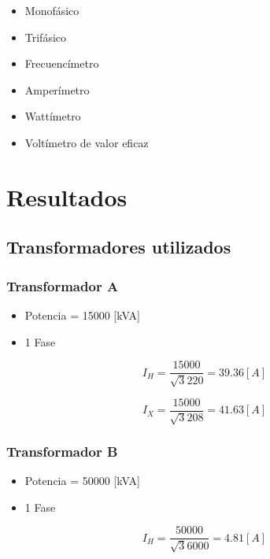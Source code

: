 \documentclass[]{article}
\begin{document}
	\begin{itemize}
	
	\item 	Monofásico
		\item Trifásico
		\item Frecuencímetro
		\item Amperímetro
	\item 	Wattímetro
		\item Voltímetro de valor eficaz
\end{itemize}
 
  
  
  
   
	\section{Resultados}
	
	
	\subsection{Transformadores utilizados}
	
	\subsubsection{Transformador A}
	
	\begin{itemize}
		\item Potencia = 15000 [kVA]
		\item 1 Fase
	\end{itemize}
	
	\begin{equation}
	  I_H=\frac{15000}{\sqrt{3}220}=39.36[A]
	\end{equation}
	
	
	\begin{equation}
	I_X=\frac{15000}{\sqrt{3}208}=41.63[A]
	\end{equation}
	
	\subsubsection{Transformador B}
	
	\begin{itemize}
		\item Potencia = 50000 [kVA]
		\item 1 Fase
	\end{itemize}
	
		\begin{equation}
		I_H=\frac{50000}{\sqrt{3}6000}=4.81[A]
		\end{equation}
		
\end{document}

